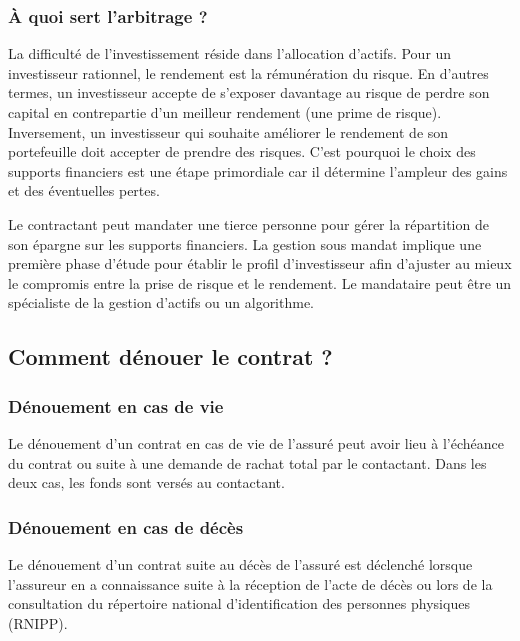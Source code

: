 \documentclass{article}
\newcommand{\blackFrame}[2]{
    \begin{tcolorbox}[colback=white,colframe=black!100!white,title={#1}]
        #2
    \end{tcolorbox}
}
\begin{document}
\subsubsection{À quoi sert l'arbitrage ?}
La difficulté de l'investissement réside dans l'allocation d'actifs. Pour un investisseur rationnel, le rendement est la rémunération du risque. En d'autres termes, un investisseur accepte de s'exposer davantage au risque de perdre son capital en contrepartie d'un meilleur rendement (une prime de risque). Inversement, un investisseur qui souhaite améliorer le rendement de son portefeuille doit accepter de prendre des risques. C'est pourquoi le choix des supports financiers est une étape primordiale car il détermine l'ampleur des gains et des éventuelles pertes. 

\blackFrame{Mandat de gestion}{
Le contractant peut mandater une tierce personne pour gérer la répartition de son épargne sur les supports financiers. La gestion sous mandat implique une première phase d'étude pour établir le profil d'investisseur afin d'ajuster au mieux le compromis entre la prise de risque et le rendement. Le mandataire peut être un spécialiste de la gestion d'actifs ou un algorithme.
}

\subsection{Comment dénouer le contrat ?}
\subsubsection{Dénouement en cas de vie}
Le dénouement d'un contrat en cas de vie de l'assuré peut avoir lieu à l'échéance du contrat ou suite à une demande de rachat total par le contactant. Dans les deux cas, les fonds sont versés au contactant.

\subsubsection{Dénouement en cas de décès}
Le dénouement d'un contrat suite au décès de l'assuré est déclenché lorsque l'assureur en a connaissance suite à la réception de l'acte de décès ou lors de la consultation du répertoire national d'identification des personnes physiques (RNIPP).
\end{document}
